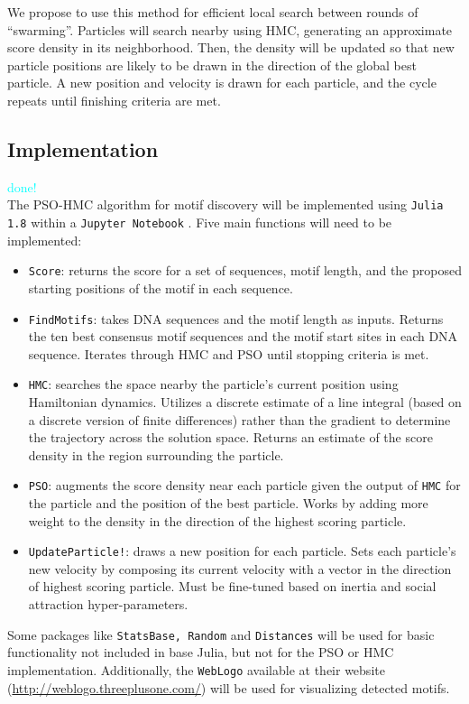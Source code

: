 \documentclass{article}
\begin{document}
  We propose to use this method for efficient local search between rounds of ``swarming''. Particles will search nearby using HMC, generating an approximate score density in its neighborhood. Then, the density will be updated so that new particle positions are likely to be drawn in the direction of the global best particle. A new position and velocity is drawn for each particle, and the cycle repeats until finishing criteria are met.
\subsection{Implementation}
\textcolor{cyan}{done!} \\
The PSO-HMC algorithm for motif discovery will be implemented using \texttt{Julia 1.8} \cite{Julia-2017} within a  \texttt{Jupyter Notebook}  \cite{Kluyver2016jupyter}. Five main functions will need to be implemented:
\begin{itemize}
	\item \texttt{Score}: returns the score for a set of sequences, motif length, and the proposed starting positions of the motif in each sequence.
	\item \texttt{FindMotifs}: takes DNA sequences and the motif length as inputs. Returns the ten best consensus motif sequences and the motif start sites in each DNA sequence. Iterates through HMC and PSO until stopping criteria is met.
	\item \texttt{HMC}: searches the space nearby the particle's current position using Hamiltonian dynamics. Utilizes a discrete estimate of a line integral (based on a discrete version of finite differences) rather than the gradient to determine the trajectory across the solution space. Returns an estimate of the score density in the region surrounding the particle.
	\item \texttt{PSO}: augments the score density near each particle given the output of \texttt{HMC} for the particle and the position of the best particle. Works by adding more weight to the density in the direction of the highest scoring particle.
	\item \texttt{UpdateParticle!}: draws a new position for each particle. Sets each particle's new velocity by composing its current velocity with a vector in the direction of highest scoring particle. Must be fine-tuned based on inertia and social attraction hyper-parameters.
\end{itemize}
  Some packages like \texttt{StatsBase, Random} and \texttt{Distances} will be used for basic functionality not included in base Julia, but not for the PSO or HMC implementation. Additionally, the \texttt{WebLogo} available at their website (\url{http://weblogo.threeplusone.com/}) will be used for visualizing detected motifs.
\end{document}
